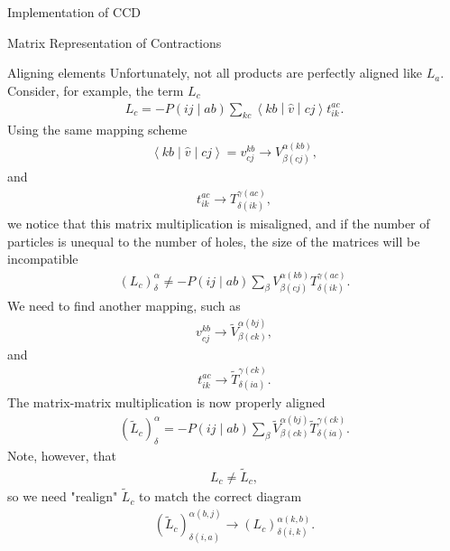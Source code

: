 \documentclass[twoside,english]{uiofysmaster}
\begin{document}
\begin{chapter}{Implementation of CCD}
\begin{section}{Matrix Representation of Contractions}
		\begin{subsection}{Aligning elements}	
			Unfortunately, not all products are perfectly aligned like $L_a$. Consider, for example, the term $L_c$
			\begin{align}
				L_c = -P\left(ij\middle|ab\right) \sum_{kc} \left<kb\middle|\hat v\middle|cj\right>t_{ik}^{ac}.
			\end{align}
			Using the same mapping scheme
			\begin{align}
				\left<kb\middle|\hat v\middle|cj\right> = v_{cj}^{kb} \rightarrow V_{\beta(cj)}^{\alpha(kb)},
			\end{align}
			and
			\begin{align}
				t_{ik}^{ac} \rightarrow T_{\delta(ik)}^{\gamma(ac)},
			\end{align}
			we notice that this matrix multiplication is misaligned, and if the number of particles is unequal to the number of holes, the  size of the matrices will be incompatible
			\begin{align}
				(L_c)_ \delta^\alpha \neq -P\left(ij\middle|ab\right) \sum_ \beta V_{\beta(cj)}^{\alpha(kb)} T_{\delta(ik)}^{\gamma(ac)}.
			\end{align}
			We need to find another mapping, such as
			\begin{align}
				v_{cj}^{kb} \rightarrow \tilde V_{\beta(ck)}^{\alpha(bj)},
			\end{align}
			and 
			\begin{align}
				t_{ik}^{ac} \rightarrow \tilde T_{\delta(ia)}^{\gamma(ck)}.
			\end{align}
			The matrix-matrix  multiplication is now properly aligned
			\begin{align}
				(\tilde L_c)_ \delta^\alpha = -P\left(ij\middle|ab\right) \sum_ \beta \tilde V_{\beta(ck)}^{\alpha(bj)} \tilde T_{\delta(ia)}^{\gamma(ck)}.
			\end{align}
			Note, however, that 
			\begin{align}
				L_c \neq \tilde L_c,
			\end{align}
			so we need "realign" $\tilde L_c$ to match the correct diagram
			\begin{align}
				(\tilde L_c)_{\delta(i,a)}^{\alpha(b,j)} \rightarrow (L_c)_{\delta(i,k)}^{\alpha(k,b)}.
			\end{align}


\end{subsection}
\end{section}
\end{chapter}
\end{document}
